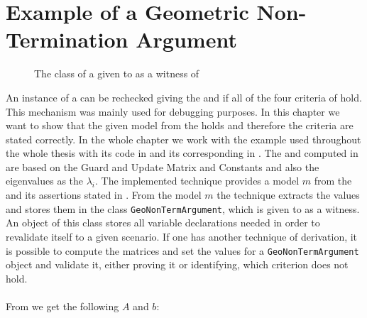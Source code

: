 \section{Example of a Geometric Non-Termination Argument}
\label{sec:verification-of-gna}
\begin{wrapfigure}{R}{0.5\textwidth}
	\centering
	
	\caption{The  class of a \gna given to \aprove as a witness of \nonterm}	
	\label{dia:gna-classdiagram}
\end{wrapfigure}
An instance of a \gna can be rechecked giving the \iterationmatrix and \iterationconstants if all of the four criteria of  hold. This mechanism was mainly used for debugging purposes. In this chapter we want to show that the given model from the \solver holds and therefore the criteria are stated correctly. \newline
In the whole chapter we work with the example used throughout the whole thesis with its  code in  and its corresponding \its in . The \iterationmatrix and \iterationconstants computed in  are based on the Guard and Update Matrix and Constants and also the eigenvalues as the $\lambda_i$.\newline
The implemented technique provides a model $m$ from the \solver and its assertions stated in . From the model $m$ the technique extracts the values and stores them in the class \texttt{GeoNonTermArgument}, which is given to \aprove as a witness. An object of this class stores all variable declarations needed in order to revalidate itself to a given scenario. If one has another technique of derivation, it is possible to compute the matrices and set the values for a  \texttt{GeoNonTermArgument} object and validate it, either proving it or identifying, which criterion does not hold.\\ \\
From  we get the following \iterationmatrix $A$ and \iterationconstants $b$: 
